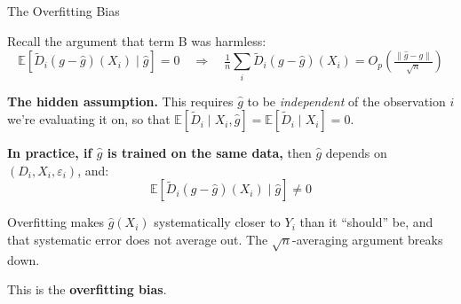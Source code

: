 \documentclass[aspectratio=169, 11pt, handout]{beamer}
\begin{document}
\begin{frame}{The Overfitting Bias}

Recall the argument that term B was harmless:
\[
\mathbb{E}\!\left[\tilde{D}_i (g - \hat{g})(X_i) \;\big|\; \hat{g}\right] = 0
\quad\Rightarrow\quad
\tfrac{1}{n}\sum_i \tilde{D}_i (g - \hat{g})(X_i) = O_p\!\left(\tfrac{\|\hat{g} - g\|}{\sqrt{n}}\right)
\]

\pause
\bigskip

\textbf{The hidden assumption.} This requires $\hat{g}$ to be \emph{independent} of the observation $i$ we're evaluating it on, so that $\mathbb{E}[\tilde{D}_i \mid X_i, \hat{g}] = \mathbb{E}[\tilde{D}_i \mid X_i] = 0$.

\pause
\bigskip

\textbf{In practice, if $\hat{g}$ is trained on the same data,} then $\hat{g}$ depends on $(D_i, X_i, \varepsilon_i)$, and:
\[
\mathbb{E}\!\left[\tilde{D}_i (g - \hat{g})(X_i) \;\big|\; \hat{g}\right] \neq 0
\]

Overfitting makes $\hat{g}(X_i)$ systematically closer to $Y_i$ than it ``should'' be, and that systematic error does not average out. The $\sqrt{n}$-averaging argument breaks down.

\bigskip

This is the \textbf{overfitting bias}.

\end{frame}
\end{document}
